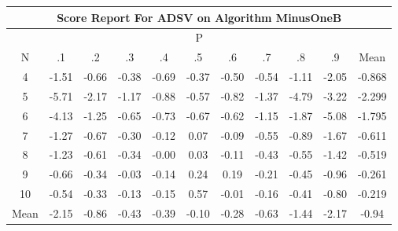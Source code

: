 \documentclass[11pt,a4paper]{report}
\begin{document}
\begin{longtable}{ | c || c | c | c | c | c | c | c | c | c || c |}
\hline
\multicolumn{11}{|c|}{ Score Report For ADSV on Algorithm MinusOneB} \\
\hline
\multicolumn{11}{|c|}{ P } \\
\hline
N & .1 & .2 & .3 & .4 & .5 & .6 & .7 & .8 & .9 & Mean\\
 \hline
 \hline
 \endhead
  4 &  \cellcolor[HTML]{FFD7D7} -1.51 &  \cellcolor[HTML]{FFEFEF} -0.66 &  \cellcolor[HTML]{FFF7F7} -0.38 &  \cellcolor[HTML]{FFEFEF} -0.69 &  \cellcolor[HTML]{FFF7F7} -0.37 &  \cellcolor[HTML]{FFEFEF} -0.50 &  \cellcolor[HTML]{FFEFEF} -0.54 &  \cellcolor[HTML]{FFDFDF} -1.11 &  \cellcolor[HTML]{FFCFCF} -2.05 & -0.868 \\
  5 &  \cellcolor[HTML]{FF7070} -5.71 &  \cellcolor[HTML]{FFC7C7} -2.17 &  \cellcolor[HTML]{FFDFDF} -1.17 &  \cellcolor[HTML]{FFE7E7} -0.88 &  \cellcolor[HTML]{FFEFEF} -0.57 &  \cellcolor[HTML]{FFE7E7} -0.82 &  \cellcolor[HTML]{FFDFDF} -1.37 &  \cellcolor[HTML]{FF8787} -4.79 &  \cellcolor[HTML]{FFAFAF} -3.22 & -2.299 \\
  6 &  \cellcolor[HTML]{FF9797} -4.13 &  \cellcolor[HTML]{FFDFDF} -1.25 &  \cellcolor[HTML]{FFEFEF} -0.65 &  \cellcolor[HTML]{FFEFEF} -0.73 &  \cellcolor[HTML]{FFEFEF} -0.67 &  \cellcolor[HTML]{FFEFEF} -0.62 &  \cellcolor[HTML]{FFDFDF} -1.15 &  \cellcolor[HTML]{FFCFCF} -1.87 &  \cellcolor[HTML]{FF8080} -5.08 & -1.795 \\
  7 &  \cellcolor[HTML]{FFDFDF} -1.27 &  \cellcolor[HTML]{FFEFEF} -0.67 &  \cellcolor[HTML]{FFF7F7} -0.30 &  \cellcolor[HTML]{FFFFFF} -0.12 &  \cellcolor[HTML]{FFFFFF} 0.07 &  \cellcolor[HTML]{FFFFFF} -0.09 &  \cellcolor[HTML]{FFEFEF} -0.55 &  \cellcolor[HTML]{FFE7E7} -0.89 &  \cellcolor[HTML]{FFD7D7} -1.67 & -0.611 \\
  8 &  \cellcolor[HTML]{FFDFDF} -1.23 &  \cellcolor[HTML]{FFEFEF} -0.61 &  \cellcolor[HTML]{FFF7F7} -0.34 &  \cellcolor[HTML]{FFFFFF} -0.00 &  \cellcolor[HTML]{FFFFFF} 0.03 &  \cellcolor[HTML]{FFFFFF} -0.11 &  \cellcolor[HTML]{FFF7F7} -0.43 &  \cellcolor[HTML]{FFEFEF} -0.55 &  \cellcolor[HTML]{FFDFDF} -1.42 & -0.519 \\
  9 &  \cellcolor[HTML]{FFEFEF} -0.66 &  \cellcolor[HTML]{FFF7F7} -0.34 &  \cellcolor[HTML]{FFFFFF} -0.03 &  \cellcolor[HTML]{FFFFFF} -0.14 &  \cellcolor[HTML]{F7F7FF} 0.24 &  \cellcolor[HTML]{F7F7FF} 0.19 &  \cellcolor[HTML]{FFF7F7} -0.21 &  \cellcolor[HTML]{FFF7F7} -0.45 &  \cellcolor[HTML]{FFE7E7} -0.96 & -0.261 \\
  10 &  \cellcolor[HTML]{FFEFEF} -0.54 &  \cellcolor[HTML]{FFF7F7} -0.33 &  \cellcolor[HTML]{FFFFFF} -0.13 &  \cellcolor[HTML]{FFFFFF} -0.15 &  \cellcolor[HTML]{EFEFFF} 0.57 &  \cellcolor[HTML]{FFFFFF} -0.01 &  \cellcolor[HTML]{FFF7F7} -0.16 &  \cellcolor[HTML]{FFF7F7} -0.41 &  \cellcolor[HTML]{FFE7E7} -0.80 & -0.219 \\
 \hline
 \hline
Mean &  \cellcolor[HTML]{FFC7C7} -2.15 &  \cellcolor[HTML]{FFE7E7} -0.86 &  \cellcolor[HTML]{FFF7F7} -0.43 &  \cellcolor[HTML]{FFF7F7} -0.39 &  \cellcolor[HTML]{FFFFFF} -0.10 &  \cellcolor[HTML]{FFF7F7} -0.28 &  \cellcolor[HTML]{FFEFEF} -0.63 &  \cellcolor[HTML]{FFD7D7} -1.44 &  \cellcolor[HTML]{FFC7C7} -2.17 &  \cellcolor[HTML]{FFE7E7} -0.94
\end{longtable}
\end{document}
